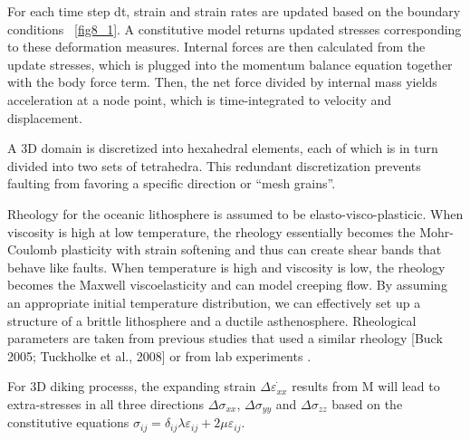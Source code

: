\documentclass[12pt]{article}
\begin{document}
For each time step dt, strain and strain rates are updated based on the boundary conditions ~\ref{fig8_1}. A constitutive model returns updated stresses corresponding to these deformation measures. Internal forces are then calculated from the update stresses, which is plugged into the momentum balance equation together with the body force term. Then, the net force divided by internal mass yields acceleration at a node point, which is time-integrated to velocity and displacement. 

A 3D domain is discretized into hexahedral elements, each of which is in turn divided into two sets of tetrahedra. This redundant discretization prevents faulting from favoring a specific direction or ``mesh grains''. 

Rheology for the oceanic lithosphere is assumed to be elasto-visco-plasticic. When viscosity is high at low temperature, the rheology essentially becomes the Mohr-Coulomb plasticity with strain softening and thus can create shear bands that behave like faults.  When temperature is high and viscosity is low, the rheology becomes the Maxwell viscoelasticity and can model creeping flow. By assuming an appropriate initial temperature distribution, we can effectively set up a structure of a brittle lithosphere and a ductile asthenosphere. Rheological parameters are taken from previous studies that used a similar rheology [Buck 2005; Tuckholke et al., 2008] or from lab experiments \citep[e.g.,][]{Kirby1987}. 

For 3D diking processs, the expanding strain  $\Delta\dot{\varepsilon_{xx}}$ results from M will lead to extra-stresses in all three directions $\Delta\sigma_{xx}$, $\Delta\sigma_{yy}$ and $\Delta\sigma_{zz}$ based on the constitutive equations $\sigma_{ij}=\delta_{ij}\lambda\varepsilon_{ij}+2\mu\varepsilon_{ij}$.
\end{document}
